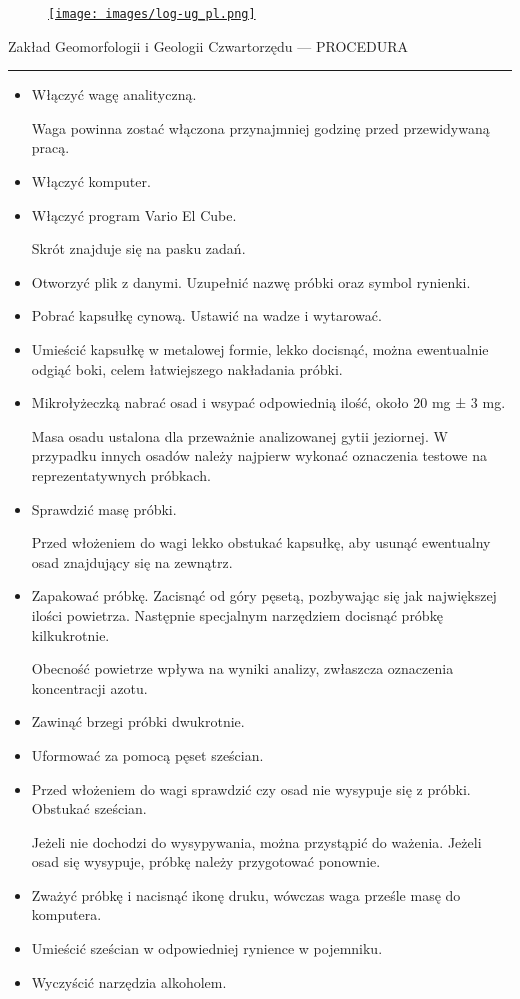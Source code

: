 \documentclass[
  letterpaper,
  DIV=11,
  numbers=noendperiod]{scrreprt}
\begin{document}
\begin{figure}

\href{https://geomorfologia.ug.edu.pl}{\texttt{[image: images/log-ug\_pl.png]}}

\end{figure}

Zakład Geomorfologii i Geologii Czwartorzędu --- PROCEDURA

\begin{center}\rule{0.5\linewidth}{0.5pt}\end{center}

\begin{itemize}
\item
  Włączyć wagę analityczną.

  Waga powinna zostać włączona przynajmniej godzinę przed przewidywaną
  pracą.
\item
  Włączyć komputer.
\item
  Włączyć program Vario El Cube.

  Skrót znajduje się na pasku zadań.
\item
  Otworzyć plik z danymi. Uzupełnić nazwę próbki oraz symbol rynienki.
\item
  Pobrać kapsułkę cynową. Ustawić na wadze i wytarować.
\item
  Umieścić kapsułkę w metalowej formie, lekko docisnąć, można
  ewentualnie odgiąć boki, celem łatwiejszego nakładania próbki.
\item
  Mikrołyżeczką nabrać osad i wsypać odpowiednią ilość, około 20 mg ± 3
  mg.

  Masa osadu ustalona dla przeważnie analizowanej gytii jeziornej. W
  przypadku innych osadów należy najpierw wykonać oznaczenia testowe na
  reprezentatywnych próbkach.
\item
  Sprawdzić masę próbki.

  Przed włożeniem do wagi lekko obstukać kapsułkę, aby usunąć ewentualny
  osad znajdujący się na zewnątrz.
\item
  Zapakować próbkę. Zacisnąć od góry pęsetą, pozbywając się jak
  największej ilości powietrza. Następnie specjalnym narzędziem docisnąć
  próbkę kilkukrotnie.

  Obecność powietrze wpływa na wyniki analizy, zwłaszcza oznaczenia
  koncentracji azotu.
\item
  Zawinąć brzegi próbki dwukrotnie.
\item
  Uformować za pomocą pęset sześcian.
\item
  Przed włożeniem do wagi sprawdzić czy osad nie wysypuje się z próbki.
  Obstukać sześcian.

  Jeżeli nie dochodzi do wysypywania, można przystąpić do ważenia.
  Jeżeli osad się wysypuje, próbkę należy przygotować ponownie.
\item
  Zważyć próbkę i nacisnąć ikonę druku, wówczas waga prześle masę do
  komputera.
\item
  Umieścić sześcian w odpowiedniej rynience w pojemniku.
\item
  Wyczyścić narzędzia alkoholem.\newpage{}
\end{itemize}
\end{document}
